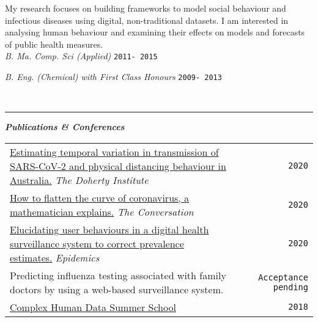 \documentclass{article}
\newcommand{\HRule}{\rule{\linewidth}{0.5mm}}
\begin{document}
My research focuses on building frameworks to model social behaviour and infectious diseases using digital, non-traditional datasets. I am interested in analysing human behaviour and examining their effects on models and forecasts of public health measures. \\

\emph{B. Ma. Comp. Sci (Applied)} \hfill  \texttt{2011- 2015}


\emph{B. Eng. (Chemical) with First Class Honours} \hfill \texttt{2009- 2013}

\\
\HRule

\textbf{\emph{Publications \& Conferences}}
\begin{table}[h!] \small
\begin{tabular}{ p{12.1cm} c r}

\href{https://www.doherty.edu.au/uploads/content_doc/Technical_report_4_update_29July2020.pdf"}{
        Estimating temporal variation in transmission of SARS-CoV-2 and physical distancing behaviour in Australia.} \emph{The Doherty Institute} && \texttt{2020}\\

\href{https://theconversation.com/how-to-flatten-the-curve-of-coronavirus-a-mathematician-explains-133514}{How to flatten the curve of coronavirus, a mathematician explains.} \emph{The Conversation} & & \texttt{2020} \\
	
 \href{https://www.sciencedirect.com/science/article/pii/S175543652030030X}{Elucidating user behaviours in a digital health surveillance system to correct prevalence estimates.} \emph{Epidemics} & & \texttt{2020} \\

 Predicting influenza testing associated with family doctors by using a web-based surveillance system. & & \texttt{Acceptance pending} \\

 \href{https://chdsummerschool.com/}{Complex Human Data Summer School} & & \texttt{2018} \\

\end{tabular}
\end{table}
\end{document}
